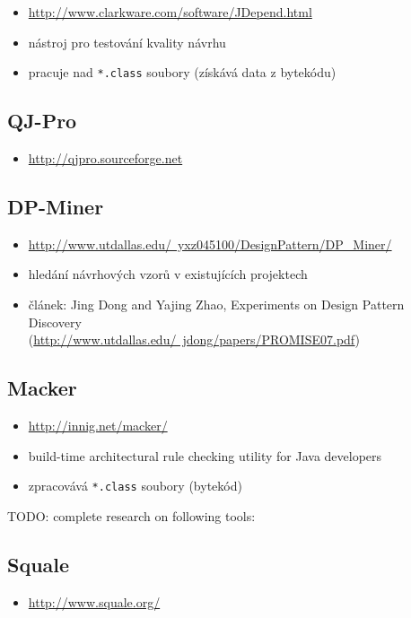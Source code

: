 \begin{itemize}
\item \href{http://www.clarkware.com/software/JDepend.html}{http://www.clarkware.com/software/JDepend.html}
\item nástroj pro testování kvality návrhu
\item pracuje nad \verb+*.class+ soubory (získává data z bytekódu)
\end{itemize}

\subsection{QJ-Pro}
\begin{itemize}
\item \href{http://qjpro.sourceforge.net}{http://qjpro.sourceforge.net}
\end{itemize}

\subsection{DP-Miner}
\begin{itemize}
\item \href{http://www.utdallas.edu/~yxz045100/DesignPattern/DP\_Miner/}{http://www.utdallas.edu/~yxz045100/DesignPattern/DP\_Miner/}
\item hledání návrhových vzorů v existujících projektech
\item článek: Jing Dong and Yajing Zhao, Experiments on Design Pattern Discovery \\ (\href{http://www.utdallas.edu/~jdong/papers/PROMISE07.pdf}{http://www.utdallas.edu/~jdong/papers/PROMISE07.pdf})
\end{itemize}

\subsection{Macker}
\begin{itemize}
\item \href{http://innig.net/macker/}{http://innig.net/macker/}
\item build-time architectural rule checking utility for Java developers
\item zpracovává \verb+*.class+ soubory (bytekód)
\end{itemize}

TODO: complete research on following tools:

\subsection{Squale}
\begin{itemize}
\item \href{http://www.squale.org/}{http://www.squale.org/}
\end{itemize}

